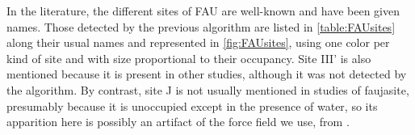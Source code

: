 \documentclass[main.tex]{subfiles}
\begin{document}

In the literature, the different sites of FAU are well-known and have been given names. Those detected by the previous algorithm are listed in \cref{table:FAUsites} along their usual names and represented in \cref{fig:FAUsites}, using one color per kind of site and with size proportional to their occupancy. Site III' is also mentioned because it is present in other studies, although it was not detected by the algorithm. By contrast, site J is not usually mentioned in studies of faujasite, presumably because it is unoccupied except in the presence of water\autocite{DiLellaFF,WaterFAU}, so its apparition here is possibly an artifact of the force field we use, from \textcite{BoulfelfelSholl2021}.
\end{document}
